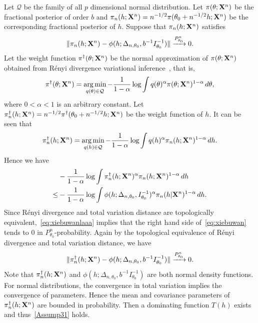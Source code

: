 \documentclass[11pt]{article}
\DeclareMathOperator*{\argmin}{arg\,min}
\theoremstyle{plain}
\theoremstyle{definition}
\theoremstyle{remark}
\begin{document}
Let $\mathcal{Q}$ be the family of all $p$ dimensional normal distribution.
Let $\pi(\theta;\mathbf{X}^{n})$ be the fractional posterior of order $b$ and $\pi_n(h;\mathbf{X}^{n})=n^{-1/2}\pi(\theta_0+n^{-1/2}h;\mathbf{X}^{n})$ be the corresponding fractional posterior of $h$.
Suppose that $\pi_n(h;\mathbf{X}^{n})$ satisfies
\begin{equation}\label{eq:xiebuwanlaaa}
    \|\pi_n(h;\mathbf{X}^{n})-\phi(h;\Delta_{n,\theta_0},b^{-1}I_{\theta_0}^{-1})\| \xrightarrow{P_{\theta_0}^n}0.
\end{equation}
Let the weight function $\pi^{\dagger}(\theta;\mathbf{X}^{n})$ be the normal approximation of $\pi(\theta;\mathbf{X}^{n})$ obtained from R\'{e}nyi divergence variational inference~\citep{NIPS2016_6208}, that is,
    $$
    \pi^{\dagger}(\theta;\BX^{n})=\argmin_{q(\theta)\in\mathcal{Q}} -\frac{1}{1-\alpha} \log \int q(\theta)^{\alpha} \pi(\theta;\BX^{n})^{1-\alpha}\, d\theta,
    $$
    where $0<\alpha<1$ is an arbitrary constant.
    Let $\pi_n^{\dagger}(h;\mathbf{X}^{n})=n^{-1/2}\pi^{\dagger}(\theta_0+n^{-1/2}h;\mathbf{X}^{n})$ be the weight function of $h$.
    It can be seen that
    $$
    \pi_n^{\dagger}(h;\BX^{n})=\argmin_{q(h)\in\mathcal{Q}} -\frac{1}{1-\alpha} \log \int q(h)^{\alpha} \pi_n(h;\BX^{n})^{1-\alpha}\, dh.
    $$
    Hence we have
    \begin{equation}\label{eq:xiebuwan}
        \begin{split}
        &-\frac{1}{1-\alpha} \log \int \pi^{\dagger}_n(h;\mathbf{X}^{n})^{\alpha} \pi_n(h;\mathbf{X}^{n})^{1-\alpha}\, dh
        \\
    \leq&
    -\frac{1}{1-\alpha} \log \int \phi(h;\Delta_{n,\theta_0}, I_{\theta_0}^{-1})^{\alpha} \pi_n(h|\mathbf{X}^{n})^{1-\alpha}\, dh.
        \end{split}
    \end{equation}
    Since R\'{e}nyi divergence and total variation distance are topologically equivalent,~\eqref{eq:xiebuwanlaaa} implies that the right hand side of~\eqref{eq:xiebuwan} tends to $0$ in $P_{\theta_0}^n$-probability.
    Again by the topological equivalence of R\'{e}nyi divergence and total variation distance, we have
\begin{equation*}
    \|\pi_n^{\dagger}(h;\mathbf{X}^{n})-\phi(h;\Delta_{n,\theta_0},b^{-1}I_{\theta_0}^{-1})\| \xrightarrow{P_{\theta_0}^n}0.
\end{equation*}
Note that $\pi_n^{\dagger}(h;\mathbf{X}^{n})$ and $\phi(h;\Delta_{n,\theta_0},b^{-1}I_{\theta_0}^{-1})$ are both normal density functions.
For normal distributions, the convergence in total variation implies the convergence of parameters.
Hence the mean and covariance parameters of $\pi_n^{\dagger}(h;\mathbf{X}^{n})$ are bounded in probability.
    Then a dominating function $T(h)$ exists and thus~\eqref{Assump31} holds.
\end{document}
